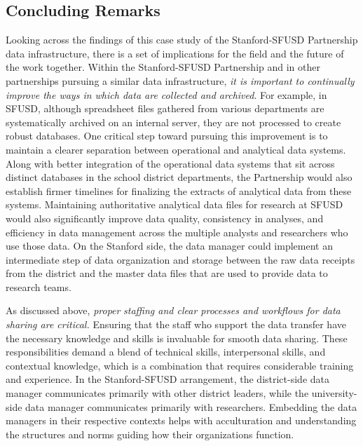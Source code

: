 \documentclass[
]{WileySix}
\begin{document}
\hypertarget{concluding-remarks-1}{%
\subsection{Concluding Remarks}\label{concluding-remarks-1}}

Looking across the findings of this case study of the Stanford-SFUSD Partnership data infrastructure, there is a set of implications for the field and the future of the work together. Within the Stanford-SFUSD Partnership and in other partnerships pursuing a similar data infrastructure, \emph{it is important to continually improve the ways in which data are collected and archived}. For example, in SFUSD, although spreadsheet files gathered from various departments are systematically archived on an internal server, they are not processed to create robust databases. One critical step toward pursuing this improvement is to maintain a clearer separation between operational and analytical data systems. Along with better integration of the operational data systems that sit across distinct databases in the school district departments, the Partnership would also establish firmer timelines for finalizing the extracts of analytical data from these systems. Maintaining authoritative analytical data files for research at SFUSD would also significantly improve data quality, consistency in analyses, and efficiency in data management across the multiple analysts and researchers who use those data. On the Stanford side, the data manager could implement an intermediate step of data organization and storage between the raw data receipts from the district and the master data files that are used to provide data to research teams.

As discussed above, \emph{proper} \emph{staffing and clear processes and workflows for data sharing are critical.} Ensuring that the staff who support the data transfer have the necessary knowledge and skills is invaluable for smooth data sharing. These responsibilities demand a blend of technical skills, interpersonal skills, and contextual knowledge, which is a combination that requires considerable training and experience. In the Stanford-SFUSD arrangement, the district-side data manager communicates primarily with other district leaders, while the university-side data manager communicates primarily with researchers. Embedding the data managers in their respective contexts helps with acculturation and understanding the structures and norms guiding how their organizations function.
\end{document}
